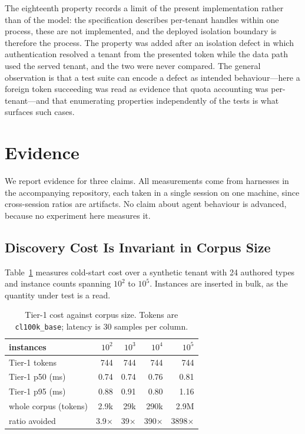 \documentclass[journal,nofonttune]{IEEEtran}
\begin{document}
The eighteenth property records a limit of the present implementation rather
than of the model: the specification describes per-tenant handles within one
process, these are not implemented, and the deployed isolation boundary is
therefore the process. The property was added after an isolation defect in
which authentication resolved a tenant from the presented token while the
data path used the served tenant, and the two were never compared. The
general observation is that a test suite can encode a defect as intended
behaviour---here a foreign token succeeding was read as evidence that quota
accounting was per-tenant---and that enumerating properties independently of
the tests is what surfaces such cases.

\section{Evidence}
\label{sec:evidence}

We report evidence for three claims. All measurements come from harnesses in
the accompanying repository, each taken in a single session on one machine,
since cross-session ratios are artifacts. No claim about agent behaviour is
advanced, because no experiment here measures it.

\subsection{Discovery Cost Is Invariant in Corpus Size}
Table~\ref{tab:tier1} measures cold-start cost over a synthetic tenant with
24 authored types and instance counts spanning $10^2$ to $10^5$. Instances
are inserted in bulk, as the quantity under test is a read.

\begin{table}[!t]
\caption{Tier-1 cost against corpus size. Tokens are
\texttt{cl100k\_base}; latency is 30 samples per column.}
\label{tab:tier1}
\centering
\footnotesize
\begin{tabular}{lrrrr}
\toprule
instances & $10^2$ & $10^3$ & $10^4$ & $10^5$ \\
\midrule
Tier-1 tokens         & 744 & 744 & 744 & 744 \\
Tier-1 p50 (ms)       & 0.74 & 0.74 & 0.76 & 0.81 \\
Tier-1 p95 (ms)       & 0.88 & 0.91 & 0.80 & 1.16 \\
whole corpus (tokens) & 2.9k & 29k & 290k & 2.9M \\
ratio avoided         & 3.9$\times$ & 39$\times$ & 390$\times$ & 3898$\times$ \\
\bottomrule
\end{tabular}
\end{table}
\end{document}
